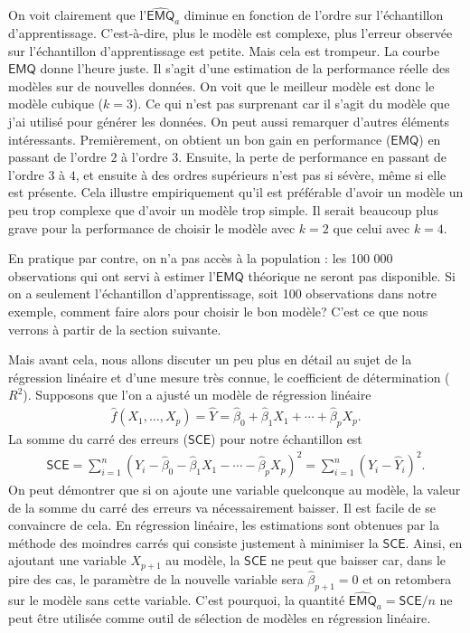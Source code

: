 \documentclass[
  11pt,
  letterpaper,
]{book}
\theoremstyle{definition}
\theoremstyle{definition}
\theoremstyle{definition}
\theoremstyle{remark}
\begin{document}
On voit clairement que l'\(\widehat{\mathsf{EMQ}}_a\) diminue en fonction de l'ordre sur l'échantillon d'apprentissage. C'est-à-dire, plus le modèle est complexe, plus l'erreur observée sur l'échantillon d'apprentissage est petite. Mais cela est trompeur. La courbe \(\mathsf{EMQ}\) donne l'heure juste. Il s'agit d'une estimation de la performance réelle des modèles sur de nouvelles données. On voit que le meilleur modèle est donc le modèle cubique (\(k=3\)). Ce qui n'est pas surprenant car il s'agit du modèle que j'ai utilisé pour générer les données. On peut aussi remarquer d'autres éléments intéressants. Premièrement, on obtient un bon gain en performance (\(\mathsf{EMQ}\)) en passant de l'ordre \(2\) à l'ordre \(3\). Ensuite, la perte de performance en passant de l'ordre \(3\) à \(4\), et ensuite à des ordres supérieurs n'est pas si sévère, même si elle est présente. Cela illustre empiriquement qu'il est préférable d'avoir un modèle un peu trop complexe que d'avoir un modèle trop simple. Il serait beaucoup plus grave pour la performance de choisir le modèle avec \(k=2\) que celui avec \(k=4\).

En pratique par contre, on n'a pas accès à la population : les 100 000 observations qui ont servi à estimer l'\(\mathsf{EMQ}\) théorique ne seront pas disponible. Si on a seulement l'échantillon d'apprentissage, soit 100 observations dans notre exemple, comment faire alors pour choisir le bon modèle? C'est ce que nous verrons à partir de la section suivante.

Mais avant cela, nous allons discuter un peu plus en détail au sujet de la régression linéaire et d'une mesure très connue, le coefficient de détermination (\(R^2\)). Supposons que l'on a ajusté un modèle de régression linéaire
\begin{align*}
\widehat{f}(X_1, \ldots, X_p) = \widehat{Y}=\widehat{\beta}_0 + \widehat{\beta}_1X_1+ \cdots + \widehat{\beta}_p X_p.
\end{align*}
La somme du carré des erreurs (\(\mathsf{SCE}\)) pour notre échantillon est
\begin{align*}
\mathsf{SCE}=\sum_{i=1}^n (Y_i - \widehat{\beta}_0 - \widehat{\beta}_1X_1 - \cdots - \widehat{\beta}_p X_p)^2 = \sum_{i=1}^n (Y_i-\widehat{Y}_i)^2.
 \end{align*}
On peut démontrer que si on ajoute une variable quelconque au modèle, la valeur de la somme du carré des erreurs va nécessairement baisser. Il est facile de se convaincre de cela. En régression linéaire, les estimations sont obtenues par la méthode des moindres carrés qui consiste justement à minimiser la \(\mathsf{SCE}\). Ainsi, en ajoutant une variable \(X_{p+1}\) au modèle, la \(\mathsf{SCE}\) ne peut que baisser car, dans le pire des cas, le paramètre de la nouvelle variable sera \(\widehat{\beta}_{p+1}=0\) et on retombera sur le modèle sans cette variable. C'est pourquoi, la quantité \(\widehat{\mathsf{EMQ}}_a=\mathsf{SCE}/n\) ne peut être utilisée comme outil de sélection de modèles en régression linéaire.
\end{document}
